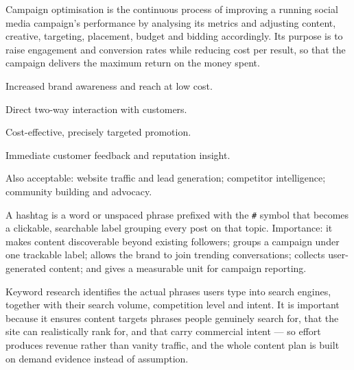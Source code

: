 \begin{qlist}
Campaign optimisation is the continuous process of improving a running social
media campaign's performance by analysing its metrics and adjusting content,
creative, targeting, placement, budget and bidding accordingly. Its purpose is
to raise engagement and conversion rates while reducing cost per result, so
that the campaign delivers the maximum return on the money spent.

\begin{apts}
\item Increased brand awareness and reach at low cost.
\item Direct two-way interaction with customers.
\item Cost-effective, precisely targeted promotion.
\item Immediate customer feedback and reputation insight.
\end{apts}
Also acceptable: website traffic and lead generation; competitor intelligence;
community building and advocacy.

A hashtag is a word or unspaced phrase prefixed with the \texttt{\#} symbol
that becomes a clickable, searchable label grouping every post on that topic.
Importance: it makes content discoverable beyond existing followers; groups a
campaign under one trackable label; allows the brand to join trending
conversations; collects user-generated content; and gives a measurable unit for
campaign reporting.

Keyword research identifies the actual phrases users type into search engines,
together with their search volume, competition level and intent. It is
important because it ensures content targets phrases people genuinely search
for, that the site can realistically rank for, and that carry commercial intent
--- so effort produces revenue rather than vanity traffic, and the whole content
plan is built on demand evidence instead of assumption.


\end{qlist}
